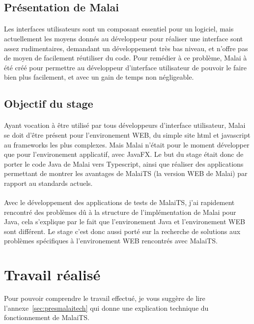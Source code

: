 \documentclass[11pt, a4paper, pdftex]{article}
\begin{document}
        \subsection{Présentation de Malai}\label{subsec:premal}
            \paragraph{}
                Les interfaces utilisateurs sont un composant essentiel pour un logiciel, mais actuellement les moyens donnés au développeur pour réaliser
                une interface sont assez rudimentaires, demandant un développement très bas niveau, et n'offre pas de moyen de facilement réutiliser du code.
                Pour remédier à ce problème, Malai à été créé pour permettre au développeur d'interface utilisateur de pouvoir le faire bien plus facilement, et avec un gain de temps non négligeable.
    \vspace{1cm}
        \subsection{Objectif du stage}\label{subsec:objsta}
            \paragraph{}
                Ayant vocation à être utilisé par tous développeurs d'interface utilisateur, Malai se doit d'être présent pour l'environement WEB, du simple site html et javascript au frameworks les plus complexes.
                Mais Malai n'était pour le moment développer que pour l'environement applicatif, avec JavaFX. Le but du stage était donc de porter le code Java de Malai
                vers Typescript, ainsi que réaliser des applications permettant de montrer les avantages de MalaiTS (la version WEB de Malai) par rapport au standards actuels.
            \paragraph{}
                Avec le développement des applications de tests de MalaiTS, j'ai rapidement rencontré des problèmes dû à la structure de l'implémentation de Malai pour Java,
                cela s'explique par le fait que l'environement Java et l'environement WEB sont différent.
                Le stage c'est donc aussi porté sur la recherche de solutions aux problèmes spécifiques à l'environement WEB rencontrés avec MalaiTS\@.
    \newpage
    \section{Travail réalisé}\label{sec:trarea}
        Pour pouvoir comprendre le travail effectué, je vous suggère de lire l'annexe~\ref{sec:presmalaitech} qui donne une explication technique du fonctionnement de MalaiTS\@.
\end{document}
